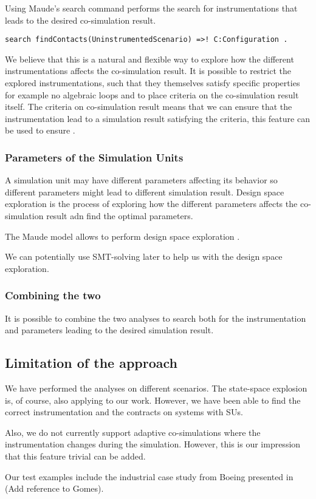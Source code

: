Using Maude's search command performs the search for instrumentations that leads to the desired co-simulation result.

\begin{lstlisting}
search findContacts(UninstrumentedScenario) =>! C:Configuration .
\end{lstlisting}

We believe that this is a natural and flexible way to explore how the different instrumentations affects the co-simulation result.
It is possible to restrict the explored instrumentations, such that they themselves satisfy specific properties for example no algebraic loops and to place criteria on the co-simulation result itself. 
The criteria on co-simulation result means that we can ensure that the instrumentation lead to a simulation result satisfying the criteria, this feature can be used to ensure .

\subsubsection{Parameters of the Simulation Units}
A simulation unit may have different parameters affecting its behavior so different parameters might lead to different simulation result.
Design space exploration is the process of exploring how the different parameters affects the co-simulation result adn find the optimal parameters. 

The Maude model allows to perform design space exploration .

We can potentially use SMT-solving later to help us with the design space exploration.

\subsubsection{Combining the two}
It is possible to combine the two analyses to search both for the instrumentation and parameters leading to the desired simulation result.





\subsection{Limitation of the approach}
We have performed the analyses on different scenarios. 
The state-space explosion is, of course, also applying to our work. 
However, we have been able to find the correct instrumentation and the contracts on systems with  SUs.

Also, we do not currently support adaptive co-simulations  where the instrumentation changes during the simulation. 
However, this is our impression that this feature trivial can be added. 

Our test examples include the industrial case study from Boeing presented in (Add reference to Gomes). 